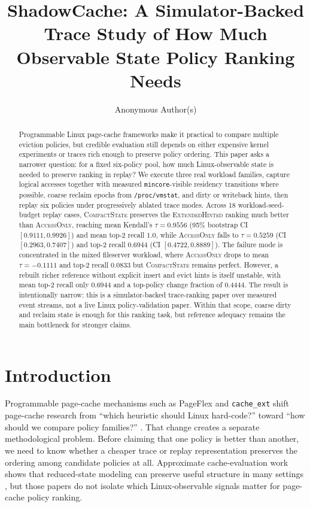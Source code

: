\documentclass{article}
\title{ShadowCache: A Simulator-Backed Trace Study of How Much Observable State Policy Ranking Needs}
\author{
  Anonymous Author(s)
}
\newcommand{\traceext}{\textsc{ExtendedHinted}}
\newcommand{\tracecompact}{\textsc{CompactState}}
\newcommand{\traceaccess}{\textsc{AccessOnly}}
\begin{document}
\maketitle

\begin{abstract}
Programmable Linux page-cache frameworks make it practical to compare multiple eviction policies, but credible evaluation still depends on either expensive kernel experiments or traces rich enough to preserve policy ordering. This paper asks a narrower question: for a fixed six-policy pool, how much Linux-observable state is needed to preserve ranking in replay? We execute three real workload families, capture logical accesses together with measured \texttt{mincore}-visible residency transitions where possible, coarse reclaim epochs from \texttt{/proc/vmstat}, and dirty or writeback hints, then replay six policies under progressively ablated trace modes. Across 18 workload-seed-budget replay cases, \tracecompact{} preserves the \traceext{} ranking much better than \traceaccess{}, reaching mean Kendall's $\tau=0.9556$ (95\% bootstrap CI $[0.9111, 0.9926]$) and mean top-2 recall $1.0$, while \traceaccess{} falls to $\tau=0.5259$ (CI $[0.2963, 0.7407]$) and top-2 recall $0.6944$ (CI $[0.4722, 0.8889]$). The failure mode is concentrated in the mixed fileserver workload, where \traceaccess{} drops to mean $\tau=-0.1111$ and top-2 recall $0.0833$ but \tracecompact{} remains perfect. However, a rebuilt richer reference without explicit insert and evict hints is itself unstable, with mean top-2 recall only $0.6944$ and a top-policy change fraction of $0.4444$. The result is intentionally narrow: this is a simulator-backed trace-ranking paper over measured event streams, not a live Linux policy-validation paper. Within that scope, coarse dirty and reclaim state is enough for this ranking task, but reference adequacy remains the main bottleneck for stronger claims.
\end{abstract}

\section{Introduction}
Programmable page-cache mechanisms such as PageFlex and \texttt{cache\_ext} shift page-cache research from ``which heuristic should Linux hard-code?'' toward ``how should we compare policy families?'' \citep{yelam2025pageflex,cacheext}. That change creates a separate methodological problem. Before claiming that one policy is better than another, we need to know whether a cheaper trace or replay representation preserves the ordering among candidate policies at all. Approximate cache-evaluation work shows that reduced-state modeling can preserve useful structure in many settings \citep{waldspurger2017miniature,waldspurger2015shards,hu2016aet,shakiba2024kosmo}, but those papers do not isolate which Linux-observable signals matter for page-cache policy ranking.
\end{document}
